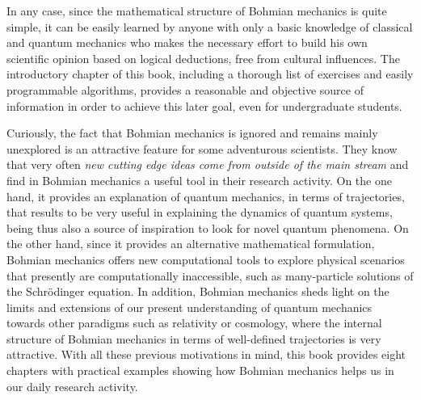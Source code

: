 \documentclass[onecolumn,nofootinbib, secnumarabic, amsmath, nobibnotes,12pt,aps,pra]{revtex4-1}
\begin{document}
In any case, since the mathematical structure of Bohmian mechanics is quite simple, it can be easily learned by anyone with only a basic knowledge of classical and quantum mechanics who makes the necessary effort to build his own scientific opinion based on logical deductions, free from cultural influences. The introductory chapter of this book, including a thorough list of exercises and easily programmable algorithms, provides a reasonable and objective source of information in order to achieve this later goal, even for undergraduate students.

Curiously, the fact that Bohmian mechanics is ignored and remains mainly unexplored is an attractive feature for some adventurous scientists. They know that very often \emph{new cutting edge ideas come from outside of the main stream} and find in Bohmian mechanics a useful tool in their research activity. On the one hand, it provides an explanation of quantum mechanics, in terms of trajectories, that results to be very useful in explaining the dynamics of quantum systems, being thus also a source of inspiration to look for novel quantum phenomena. On the other hand, since it provides an alternative mathematical formulation, Bohmian mechanics offers new computational tools to explore physical scenarios that presently are computationally inaccessible, such as many-particle solutions of the Schr\"odinger equation. In addition, Bohmian mechanics sheds light on the limits and extensions of our present understanding of quantum mechanics towards other paradigms such as relativity or cosmology, where the internal structure of Bohmian mechanics in terms of well-defined trajectories is very attractive. With all these previous motivations in mind, this book provides eight chapters with practical examples showing how Bohmian mechanics helps us in our daily research activity.
\end{document}
